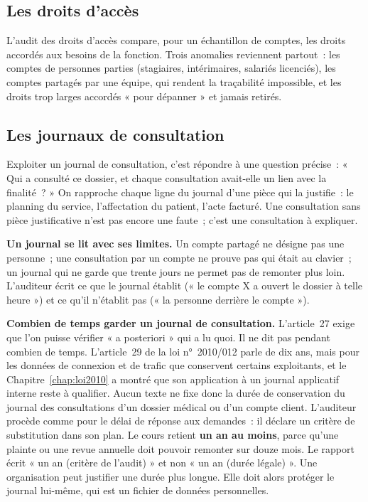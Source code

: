 \subsection{Les droits d'accès}

L'audit des droits d'accès compare, pour un échantillon de comptes, les
droits accordés aux besoins de la fonction. Trois anomalies reviennent
partout~: les comptes de personnes parties (stagiaires, intérimaires,
salariés licenciés), les comptes partagés par une équipe, qui rendent la
traçabilité impossible, et les droits trop larges accordés « pour
dépanner » et jamais retirés.

\subsection{Les journaux de consultation}

Exploiter un journal de consultation, c'est répondre à une question précise~:
« Qui a consulté ce dossier, et chaque consultation avait-elle un lien avec
la finalité~? » On rapproche chaque ligne du journal d'une pièce qui la
justifie~: le planning du service, l'affectation du patient, l'acte facturé.
Une consultation sans pièce justificative n'est pas encore une faute~; c'est
une consultation à expliquer.

\begin{boxinfo}
\textbf{Un journal se lit avec ses limites.} Un compte partagé ne désigne pas
une personne~; une consultation par un compte ne prouve pas qui était au
clavier~; un journal qui ne garde que trente jours ne permet pas de
remonter plus loin. L'auditeur écrit ce que le journal établit (« le compte
X a ouvert le dossier à telle heure ») et ce qu'il n'établit pas (« la
personne derrière le compte »).
\end{boxinfo}

\textbf{Combien de temps garder un journal de consultation.} L'article~27
exige que l'on puisse vérifier « a posteriori » qui a lu quoi. Il ne dit
pas pendant combien de temps. L'article~29 de la loi n°~2010/012 parle de
dix ans, mais pour les données de connexion et de trafic que conservent
certains exploitants, et le Chapitre~\ref{chap:loi2010} a montré que son
application à un journal applicatif interne reste à qualifier. Aucun texte
ne fixe donc la durée de conservation du journal des consultations d'un
dossier médical ou d'un compte client. L'auditeur procède comme pour le
délai de réponse aux demandes~: il déclare un critère de substitution dans
son plan. Le cours retient \textbf{un an au moins}, parce qu'une plainte
ou une revue annuelle doit pouvoir remonter sur douze mois. Le rapport
écrit « un an (critère de l'audit) » et non « un an (durée légale) ». Une
organisation peut justifier une durée plus longue. Elle doit alors
protéger le journal lui-même, qui est un fichier de données personnelles.

